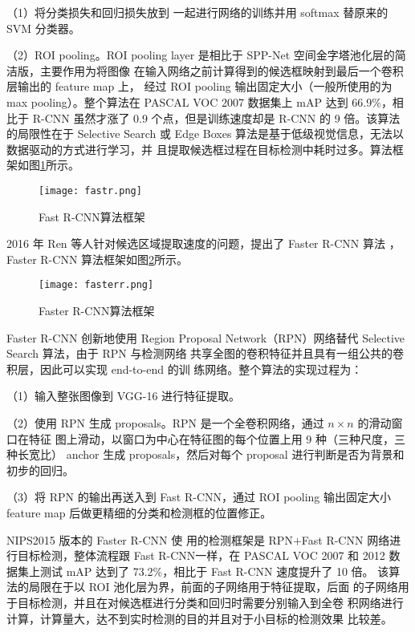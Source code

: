 （1）将分类损失和回归损失放到
一起进行网络的训练并用 softmax 替原来的 SVM 分类器。

（2）ROI pooling。ROI
pooling layer 是相比于 SPP-Net 空间金字塔池化层的简洁版，主要作用为将图像
在输入网络之前计算得到的候选框映射到最后一个卷积层输出的 feature map 上，
经过 ROI pooling 输出固定大小（一般所使用的为 max pooling）。整个算法在
PASCAL VOC 2007 数据集上 mAP 达到 66.9$\%$，相比于 R-CNN 虽然才涨了 0.9
个点，但是训练速度却是 R-CNN 的 9 倍。该算法的局限性在于 Selective Search
或 Edge Boxes 算法是基于低级视觉信息，无法以数据驱动的方式进行学习，并
且提取候选框过程在目标检测中耗时过多。算法框架如图\ref{fastr}所示。

\begin{figure}[htbp]
    \centering
    \texttt{[image: fastr.png]}
    \caption{Fast R-CNN算法框架}
    \label{fastr}
\end{figure}

2016 年 Ren 等人针对候选区域提取速度的问题，提出了 Faster R-CNN 算法
\cite{ren2015faster}，Faster R-CNN 算法框架如图\ref{fasterr}所示。

\begin{figure}[htbp]
    \centering
    \texttt{[image: fasterr.png]}
    \caption{Faster R-CNN算法框架}
    \label{fasterr}
\end{figure}

Faster R-CNN 创新地使用 Region
Proposal Network（RPN）网络替代 Selective Search 算法，由于 RPN 与检测网络
共享全图的卷积特征并且具有一组公共的卷积层，因此可以实现 end-to-end 的训
练网络。整个算法的实现过程为：

（1）输入整张图像到 VGG-16 进行特征提取。

（2）使用 RPN 生成 proposals。RPN 是一个全卷积网络，通过 $n \times n$ 的滑动窗口在特征
图上滑动，以窗口为中心在特征图的每个位置上用 9 种（三种尺度，三种长宽比）
anchor 生成 proposals，然后对每个 proposal 进行判断是否为背景和初步的回归。

（3）将 RPN 的输出再送入到 Fast R-CNN，通过 ROI pooling 输出固定大小 feature
map 后做更精细的分类和检测框的位置修正。

NIPS2015 版本的 Faster R-CNN 使
用的检测框架是 RPN+Fast R-CNN 网络进行目标检测，整体流程跟 Fast R-CNN一样，在 PASCAL VOC 2007 和 2012 数据集上测试 mAP 达到了 73.2$\%$，相比于
Fast R-CNN 速度提升了 10 倍。
该算法的局限在于以 ROI 池化层为界，前面的子网络用于特征提取，后面
的子网络用于目标检测，并且在对候选框进行分类和回归时需要分别输入到全卷
积网络进行计算，计算量大，达不到实时检测的目的并且对于小目标的检测效果
比较差。

